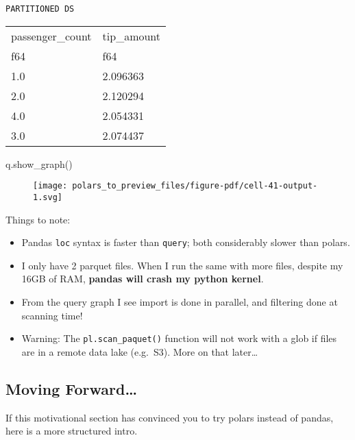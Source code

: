 \documentclass[
  letterpaper,
  DIV=11,
  numbers=noendperiod]{scrartcl}
\newenvironment{Shaded}{\begin{snugshade}}{\end{snugshade}}
\newcommand{\NormalTok}[1]{\textcolor[rgb]{0.00,0.23,0.31}{#1}}
\providecommand{\tightlist}{%
  \setlength{\itemsep}{0pt}\setlength{\parskip}{0pt}}\usepackage{longtable,booktabs,array}
\begin{document}
\begin{verbatim}
PARTITIONED DS
\end{verbatim}

\begin{longtable}[]{@{}ll@{}}
\toprule()
passenger\_count & tip\_amount \\
f64 & f64 \\
\midrule()
\endhead
1.0 & 2.096363 \\
2.0 & 2.120294 \\
4.0 & 2.054331 \\
3.0 & 2.074437 \\
\bottomrule()
\end{longtable}

\begin{Shaded}
\begin{Highlighting}[]
\NormalTok{q.show\_graph()}
\end{Highlighting}
\end{Shaded}

\begin{figure}[H]

{\centering \texttt{[image: polars\_to\_preview\_files/figure-pdf/cell-41-output-1.svg]}

}

\end{figure}

Things to note:

\begin{itemize}
\tightlist
\item
  Pandas \texttt{loc} syntax is faster than \texttt{query}; both
  considerably slower than polars.
\item
  I only have 2 parquet files. When I run the same with more files,
  despite my 16GB of RAM, \textbf{pandas will crash my python kernel}.
\item
  From the query graph I see import is done in parallel, and filtering
  done at scanning time!
\item
  Warning: The \texttt{pl.scan\_paquet()} function will not work with a
  glob if files are in a remote data lake (e.g.~S3). More on that
  later\ldots{}
\end{itemize}

\hypertarget{moving-forward}{%
\subsection{Moving Forward\ldots{}}\label{moving-forward}}

If this motivational section has convinced you to try polars instead of
pandas, here is a more structured intro.
\end{document}
